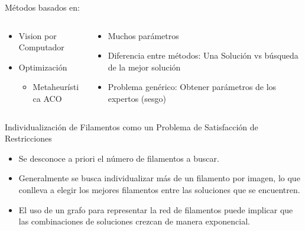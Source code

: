 \documentclass[]{beamer}
\begin{document}
\begin{frame}{M\'etodos basados en:}
    \begin{columns}
        \begin{column}{0.4\textwidth}
             \begin{itemize}
                \item Vision por Computador
                \item Optimizaci\'on
                \begin{itemize}
                    \item Metaheur\'istica ACO
                \end{itemize}
            \end{itemize}
        \end{column}
        \begin{column}{0.6\textwidth}
            \begin{itemize}
                \item Muchos par\'ametros
                \item Diferencia entre m\'etodos: Una Soluci\'on vs b\'usqueda de la mejor soluci\'on
                \item Problema gen\'erico: Obtener par\'ametros de los expertos (sesgo)
            \end{itemize}
        \end{column}
    \end{columns}
\end{frame}

\begin{frame}{Individualizaci\'on de Filamentos como un Problema de Satisfacci\'on de Restricciones}
    \begin{itemize}
    \item Se desconoce a priori el n\'umero de filamentos a buscar.%
    \item Generalmente se busca individualizar m\'as de un filamento por imagen, lo que conlleva a elegir los mejores filamentos entre las soluciones que se encuentren.
    \item El uso de un grafo para representar la red de filamentos puede implicar que las combinaciones de soluciones crezcan de manera exponencial.
\end{itemize}
\end{frame}
\end{document}

